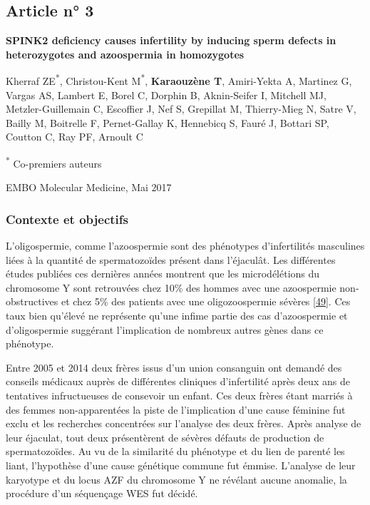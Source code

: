 \documentclass[12pt,twoside]{reedthesis}
\theoremstyle{definition}
\theoremstyle{definition}
\theoremstyle{remark}
\begin{document}
  \newpage
  
  \newpage  
  
  \subsection{Article n° 3}\label{article-n-3}
  
  \textbf{SPINK2 deficiency causes infertility by inducing sperm defects
  in heterozygotes and azoospermia in homozygotes}
  
  Kherraf ZE\textsuperscript{*}, Christou-Kent M\textsuperscript{*},
  \textbf{Karaouzène T}, Amiri-Yekta A, Martinez G, Vargas AS, Lambert E,
  Borel C, Dorphin B, Aknin-Seifer I, Mitchell MJ, Metzler-Guillemain C,
  Escoffier J, Nef S, Grepillat M, Thierry-Mieg N, Satre V, Bailly M,
  Boitrelle F, Pernet-Gallay K, Hennebicq S, Fauré J, Bottari SP, Coutton
  C, Ray PF, Arnoult C
  
  \textsuperscript{*} Co-premiers auteurs
  
  EMBO Molecular Medicine, Mai 2017
  
  \newpage
  
  \subsubsection{Contexte et objectifs}\label{contexte-et-objectifs-2}
  
  L'oligospermie, comme l'azoospermie sont des phénotypes d'infertilités
  masculines liées à la quantité de spermatozoïdes présent dans
  l'éjaculât. Les différentes études publiées ces dernières années
  montrent que les microdélétions du chromosome Y sont retrouvées chez
  10\% des hommes avec une azoospermie non-obstructives et chez 5\% des
  patients avec une oligozoospermie sévères
  {[}\protect\hyperlink{ref-Hotaling2014}{49}{]}. Ces taux bien qu'élevé
  ne représente qu'une infime partie des cas d'azoospermie et
  d'oligospermie suggérant l'implication de nombreux autres gènes dans ce
  phénotype.
  
  Entre 2005 et 2014 deux frères issus d'un union consanguin ont demandé
  des conseils médicaux auprès de différentes cliniques d'infertilité
  après deux ans de tentatives infructueuses de consevoir un enfant. Ces
  deux frères étant marriés à des femmes non-apparentées la piste de
  l'implication d'une cause féminine fut exclu et les recherches
  concentrées sur l'analyse des deux frères. Après analyse de leur
  éjaculat, tout deux présentèrent de sévères défauts de production de
  spermatozoïdes. Au vu de la similarité du phénotype et du lien de
  parenté les liant, l'hypothèse d'une cause génétique commune fut émmise.
  L'analyse de leur karyotype et du locus AZF du chromosome Y ne révélant
  aucune anomalie, la procédure d'un séquençage WES fut décidé.
  
\end{document}
